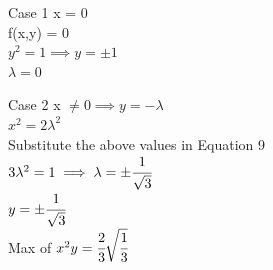 \documentclass{beamer}
\begin{document}
\begin{frame}{Case 1}
x = 0\\
\vspace{1em}
f(x,y) = 0\\
\vspace{1em}
$y^{2} = 1 \implies y= \pm 1$\\
\vspace{1em}
$\lambda = 0$
\end{frame}

\begin{frame}{Case 2}
x $\neq  0 \implies y = - \lambda$\\
\vspace{1em}
\pause $x^{2} = 2\lambda^{2}$ \\ \pause Substitute the above values in Equation 9\\
\vspace{1em}
\pause $3\lambda^{2} = 1 \implies \lambda = \pm \cfrac{1}{\sqrt{3}}$\\
\vspace{1em}
\pause $y = \pm \cfrac{1}{\sqrt{3}}$\\
\vspace{1em}
Max of $x^{2}y = \cfrac{2}{3} \sqrt{\cfrac{1}{3}}$
\end{frame}


%


\end{document}
